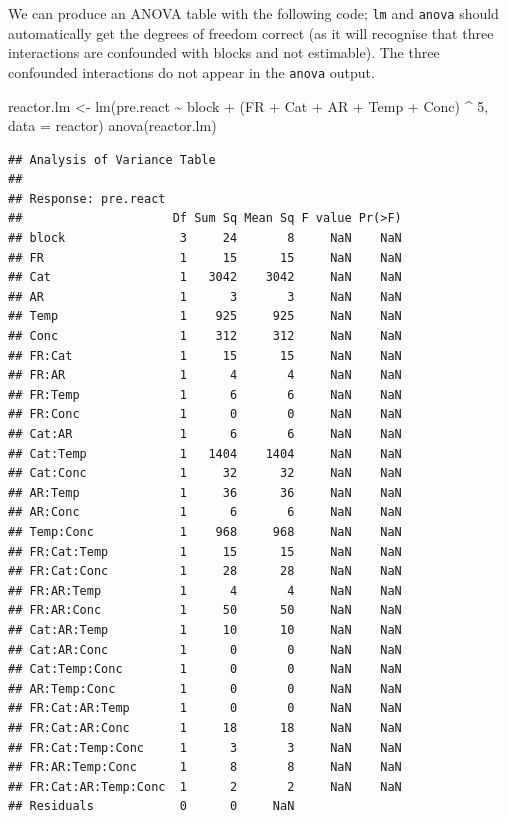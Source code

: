 \documentclass[
]{book}
\newenvironment{Shaded}{\begin{snugshade}}{\end{snugshade}}
\newcommand{\AttributeTok}[1]{\textcolor[rgb]{0.77,0.63,0.00}{#1}}
\newcommand{\DecValTok}[1]{\textcolor[rgb]{0.00,0.00,0.81}{#1}}
\newcommand{\FunctionTok}[1]{\textcolor[rgb]{0.00,0.00,0.00}{#1}}
\newcommand{\NormalTok}[1]{#1}
\newcommand{\OtherTok}[1]{\textcolor[rgb]{0.56,0.35,0.01}{#1}}
\newcommand{\SpecialCharTok}[1]{\textcolor[rgb]{0.00,0.00,0.00}{#1}}
\theoremstyle{definition}
\theoremstyle{definition}
\theoremstyle{definition}
\theoremstyle{definition}
\theoremstyle{remark}
\begin{document}
We can produce an ANOVA table with the following code; \texttt{lm} and \texttt{anova} should automatically get the degrees of freedom correct (as it will recognise that three interactions are confounded with blocks and not estimable). The three confounded interactions do not appear in the \texttt{anova} output.

\begin{Shaded}
\begin{Highlighting}[]
\NormalTok{reactor.lm }\OtherTok{\textless{}{-}} \FunctionTok{lm}\NormalTok{(pre.react }\SpecialCharTok{\textasciitilde{}}\NormalTok{ block }\SpecialCharTok{+}\NormalTok{ (FR }\SpecialCharTok{+}\NormalTok{ Cat }\SpecialCharTok{+}\NormalTok{ AR }\SpecialCharTok{+}\NormalTok{ Temp }\SpecialCharTok{+}\NormalTok{ Conc) }\SpecialCharTok{\^{}} \DecValTok{5}\NormalTok{, }\AttributeTok{data =}\NormalTok{ reactor)}
\FunctionTok{anova}\NormalTok{(reactor.lm)}
\end{Highlighting}
\end{Shaded}

\begin{verbatim}
## Analysis of Variance Table
## 
## Response: pre.react
##                     Df Sum Sq Mean Sq F value Pr(>F)
## block                3     24       8     NaN    NaN
## FR                   1     15      15     NaN    NaN
## Cat                  1   3042    3042     NaN    NaN
## AR                   1      3       3     NaN    NaN
## Temp                 1    925     925     NaN    NaN
## Conc                 1    312     312     NaN    NaN
## FR:Cat               1     15      15     NaN    NaN
## FR:AR                1      4       4     NaN    NaN
## FR:Temp              1      6       6     NaN    NaN
## FR:Conc              1      0       0     NaN    NaN
## Cat:AR               1      6       6     NaN    NaN
## Cat:Temp             1   1404    1404     NaN    NaN
## Cat:Conc             1     32      32     NaN    NaN
## AR:Temp              1     36      36     NaN    NaN
## AR:Conc              1      6       6     NaN    NaN
## Temp:Conc            1    968     968     NaN    NaN
## FR:Cat:Temp          1     15      15     NaN    NaN
## FR:Cat:Conc          1     28      28     NaN    NaN
## FR:AR:Temp           1      4       4     NaN    NaN
## FR:AR:Conc           1     50      50     NaN    NaN
## Cat:AR:Temp          1     10      10     NaN    NaN
## Cat:AR:Conc          1      0       0     NaN    NaN
## Cat:Temp:Conc        1      0       0     NaN    NaN
## AR:Temp:Conc         1      0       0     NaN    NaN
## FR:Cat:AR:Temp       1      0       0     NaN    NaN
## FR:Cat:AR:Conc       1     18      18     NaN    NaN
## FR:Cat:Temp:Conc     1      3       3     NaN    NaN
## FR:AR:Temp:Conc      1      8       8     NaN    NaN
## FR:Cat:AR:Temp:Conc  1      2       2     NaN    NaN
## Residuals            0      0     NaN
\end{verbatim}
\end{document}
